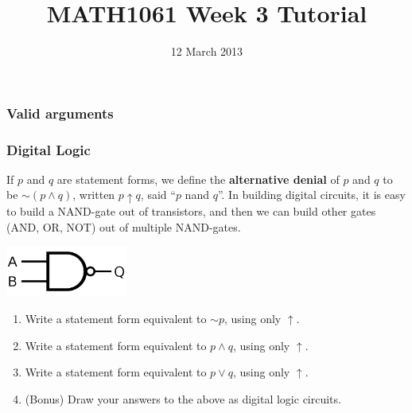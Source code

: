 \documentclass{beamer}
\title{MATH1061 Week 3 Tutorial}
\date{12 March 2013}
\newcommand{\nand}{\uparrow}
\begin{document}
\frame{\titlepage}

\begin{frame}
\frametitle{Valid arguments}
\end{frame}

\begin{frame}
\frametitle{Digital Logic}

If $p$ and $q$ are statement forms, we define the {\bf alternative denial} of
$p$ and $q$ to be $\sim (p \land q)$, written $p \nand q$, said ``$p$ nand $q$''.
In building digital circuits, it is easy to build a NAND-gate out of transistors,
and then we can build other gates (AND, OR, NOT) out of multiple NAND-gates.

\centering
\includegraphics[width=0.3\textwidth]{src/nand.png}

\begin{enumerate}
\item Write a statement form equivalent to $\sim p$, using only $\nand$.
\item Write a statement form equivalent to $p \land q$, using only $\nand$.
\item Write a statement form equivalent to $p \lor q$, using only $\nand$.
\item (Bonus) Draw your answers to the above as digital logic circuits.
\end{enumerate}

\end{frame}
\end{document}
